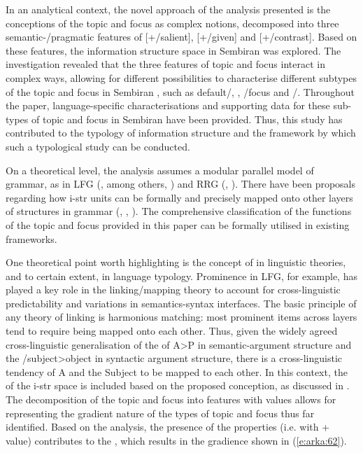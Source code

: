 \documentclass[output=paper
,modfonts
,nonflat]{langsci/langscibook}
\begin{document}
In an analytical context, the novel approach of the analysis presented is the conceptions of the topic and focus as complex notions, decomposed into three semantic-/pragmatic features of [+/\textminus salient], [+/\textminus given] and [+/\textminus contrast]. Based on these features, the information structure space in Sembiran  was explored. The investigation revealed that the three features of topic and focus interact in complex ways, allowing for different possibilities to characterise different subtypes of the topic and focus in Sembiran , such as default/, , /focus and /. Throughout the paper, language-specific characterisations and supporting data for these sub-types of topic and focus in Sembiran  have been provided. Thus, this study has contributed to the typology of information structure and the framework by which such a typological study can be conducted.

On a theoretical level, the analysis assumes a modular parallel model of grammar, as in LFG (\citealt{Bresnan2015}, among others, \citealt{Dalrymple2001}) and RRG (\citealt{VanValin2005}, \citealt{VanValin1997}). There have been proposals regarding how i-str units can be formally and precisely mapped onto other layers of structures in grammar (\citealt{King1997}, \citealt{Mycock2013}, \citealt{Butt2014}). The comprehensive classification of the  functions of the topic and focus provided in this paper can be formally utilised in existing frameworks.

One theoretical point worth highlighting is the concept of  in linguistic theories, and to certain extent, in language typology. Prominence in LFG, for example, has played a key role in the linking/mapping theory to account for cross-linguistic predictability and variations in semantics-syntax interfaces. The basic principle of any theory of linking is harmonious  matching: most prominent items across layers tend to require being mapped onto each other. Thus, given the widely agreed cross-linguistic generalisation of the  of A>P in semantic-argument structure and the /subject>object in syntactic argument structure, there is a cross-linguistic tendency of A and the Subject to be mapped to each other. In this context, the  of the i-str space is included based on the proposed conception, as discussed in . The decomposition of the topic and focus into features with values allows for representing the gradient nature of the types of topic and focus thus far identified. Based on the analysis, the presence of the properties (i.e. with + value) contributes to the , which results in the gradience shown in (\ref{e:arka:62}).
\end{document}
